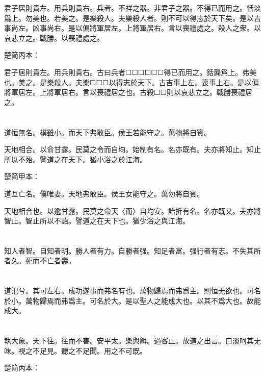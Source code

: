 \documentclass[a5paper]{ctexbook}
\begin{document}
    君子居則貴左。用兵則貴右。兵者。不祥之器。非君子之器。不得已而用之。恬淡爲上。勿美也。若美之。是樂殺人。夫樂殺人者。則不可以得志於天下矣。是以吉事尚左。凶事尚右。是以偏將軍居左。上將軍居右。言以喪禮處之。殺人之衆。以哀悲立之。戰勝。以喪禮處之。

    楚简丙本：

    君子居則貴左。用兵則貴右。古曰兵者☐☐☐☐☐☐得已而用之。銛龔爲上。弗美也。美之。是樂殺人。夫樂☐☐☐以得志於天下。古吉事上左。喪事上右。是以偏將軍居左。上將軍居右。言以喪禮居之也。古殺☐☐則以哀悲立之。戰勝喪禮居之。

    \chapter{}

    道恒無名。樸雖小。而天下弗敢臣。侯王若能守之。萬物將自賓。
    
    天地相合。以俞甘露。民莫之令而自均。始制有名。名亦既有。夫亦將知止。知止所以不殆。譬道之在天下。猶小浴之於江海。

    楚简甲本：

    道互亡名。僕唯妻。天地弗敢臣。侯王女能守之。萬勿將自賓。

    天地相合也。以逾甘露。民莫之命天〈而〉自均安。詒折有名。名亦既又。夫亦將智止。智止所以不詒。譬道之在天下也。猶少浴之與江海。

    \chapter{}

    知人者智。自知者明。勝人者有力。自勝者强。知足者富。强行者有志。不失其所者久。死而不亡者壽。

    \chapter{}

    道氾兮。其可左右。成功遂事而弗名有也。萬物歸焉而弗爲主。則恒无欲也。可名於小。萬物歸焉而弗爲主。可名於大。是以聖人之能成大也。以其不爲大也。故能成大。

    \chapter{}

    執大象。天下往。往而不害。安平太。樂與餌。過客止。故道之出言。曰淡呵其无味。視之不足見。聽之不足聞。用之不可既。

    楚简丙本：
\end{document}
